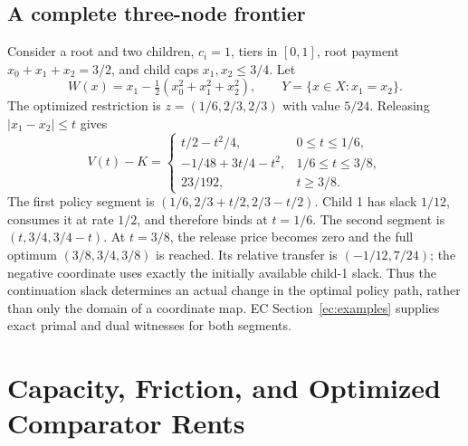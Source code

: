 \documentclass[11pt,letterpaper]{article}
\theoremstyle{definition}\newtheorem{assumption}[theorem]{Assumption}
\begin{document}
\subsection{A complete three-node frontier}
Consider a root and two children, $c_i=1$, tiers in $[0,1]$, root payment $x_0+x_1+x_2=3/2$, and child caps $x_1,x_2\leq3/4$. Let
\[
 W(x)=x_1-\tfrac12(x_0^2+x_1^2+x_2^2),\qquad Y=\{x\in X:x_1=x_2\}.
\]
The optimized restriction is $z=(1/6,2/3,2/3)$ with value $5/24$. Releasing $|x_1-x_2|\leq t$ gives
\begin{equation}\label{eq:example-frontier}
 V(t)-K=
 \begin{cases}
 t/2-t^2/4,&0\leq t\leq1/6,\\
 -1/48+3t/4-t^2,&1/6\leq t\leq3/8,\\
 23/192,&t\geq3/8.
 \end{cases}
\end{equation}
The first policy segment is $(1/6,2/3+t/2,2/3-t/2)$. Child 1 has slack $1/12$, consumes it at rate $1/2$, and therefore binds at $t=1/6$. The second segment is $(t,3/4,3/4-t)$. At $t=3/8$, the release price becomes zero and the full optimum $(3/8,3/4,3/8)$ is reached. Its relative transfer is $(-1/12,7/24)$; the negative coordinate uses exactly the initially available child-1 slack. Thus the continuation slack determines an actual change in the optimal policy path, rather than only the domain of a coordinate map. EC Section~\ref{ec:examples} supplies exact primal and dual witnesses for both segments.

\section{Capacity, Friction, and Optimized Comparator Rents}\label{sec:rents}
\end{document}
